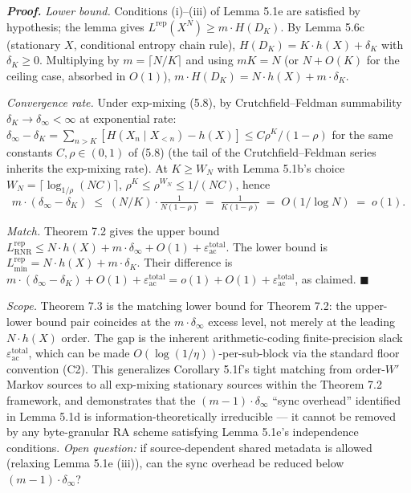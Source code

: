 \documentclass[
]{article}
\begin{document}
\emph{\textbf{Proof.}} \emph{Lower bound.} Conditions (i)--(iii) of
Lemma 5.1e are satisfied by hypothesis; the lemma gives
$L^{\mathrm{rep}}(X^N) \geq m \cdot H(D_K)$. By Lemma 5.6c (stationary
$X$, conditional entropy chain rule), $H(D_K) = K \cdot h(X) + \delta_K$
with $\delta_K \geq 0$. Multiplying by $m = \lceil N/K \rceil$ and
using $mK = N$ (or $N + O(K)$ for the ceiling case, absorbed in $O(1)$),
$m \cdot H(D_K) = N \cdot h(X) + m \cdot \delta_K$.

\emph{Convergence rate.} Under exp-mixing (5.8), by Crutchfield--Feldman
summability $\delta_K \to \delta_\infty < \infty$ at exponential rate:
$\delta_\infty - \delta_K = \sum_{n > K} [H(X_n \mid X_{<n}) - h(X)]
\leq C \rho^K / (1 - \rho)$ for the same constants $C, \rho \in (0, 1)$
of (5.8) (the tail of the Crutchfield--Feldman series inherits the
exp-mixing rate). At $K \geq W_N$ with Lemma 5.1b's choice
$W_N = \lceil \log_{1/\rho}(N C) \rceil$, $\rho^K \leq \rho^{W_N} \leq
1/(N C)$, hence
\[
m \cdot (\delta_\infty - \delta_K)
\;\leq\; (N/K) \cdot \tfrac{1}{N (1 - \rho)}
\;=\; \tfrac{1}{K (1 - \rho)}
\;=\; O(1/\log N) \;=\; o(1).
\]

\emph{Match.} Theorem 7.2 gives the upper bound
$L^{\mathrm{rep}}_{\mathrm{RNR}} \leq N \cdot h(X) + m \cdot \delta_\infty +
O(1) + \varepsilon_{\mathrm{ac}}^{\mathrm{total}}$. The lower bound is
$L^{\mathrm{rep}}_{\min} = N \cdot h(X) + m \cdot \delta_K$. Their
difference is $m \cdot (\delta_\infty - \delta_K) + O(1) +
\varepsilon_{\mathrm{ac}}^{\mathrm{total}} = o(1) + O(1) +
\varepsilon_{\mathrm{ac}}^{\mathrm{total}}$, as claimed.
\hfill$\blacksquare$

\emph{Scope.} Theorem 7.3 is the matching lower bound for Theorem 7.2:
the upper-lower bound pair coincides at the $m \cdot \delta_\infty$
excess level, not merely at the leading $N \cdot h(X)$ order. The
gap is the inherent arithmetic-coding finite-precision slack
$\varepsilon_{\mathrm{ac}}^{\mathrm{total}}$, which can be made
$O(\log(1/\eta))$-per-sub-block via the standard floor convention (C2).
This generalizes Corollary 5.1f's tight matching from order-$W'$
Markov sources to all exp-mixing stationary sources within the
Theorem 7.2 framework, and demonstrates that the
$(m-1) \cdot \delta_\infty$ ``sync overhead'' identified in Lemma 5.1d
is information-theoretically irreducible --- it cannot be removed by
any byte-granular RA scheme satisfying Lemma 5.1e's independence
conditions. \emph{Open question:} if source-dependent shared metadata
is allowed (relaxing Lemma 5.1e (iii)), can the sync overhead be
reduced below $(m-1) \cdot \delta_\infty$?
\end{document}

